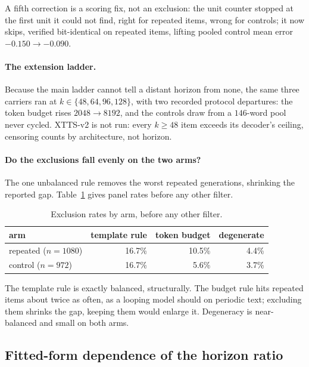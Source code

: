 A fifth correction is a scoring fix, not an exclusion: the unit counter stopped at the first unit
it could not find, right for repeated items, wrong for controls; it now skips, verified
bit-identical on repeated items, lifting pooled control mean error $-0.150\to-0.090$.

\paragraph{The extension ladder.} Because the main ladder cannot tell a distant horizon from
none, the same three carriers ran at $k\in\{48,64,96,128\}$, with two recorded protocol
departures: the token budget rises $2048\to8192$, and the controls draw from a $146$-word pool
never cycled. XTTS-v2 is not run: every $k\ge48$ item exceeds its decoder's ceiling, censoring
counts by architecture, not horizon.

\paragraph{Do the exclusions fall evenly on the two arms?} The one unbalanced rule removes the
worst repeated generations, shrinking the reported gap. Table~\ref{tab:exclarms} gives panel rates
before any other filter.

\begin{table}[tp]\centering
\caption{Exclusion rates by arm, before any other filter.}
\label{tab:exclarms}
\begin{tabular}{lrrr}
\toprule
arm & template rule & token budget & degenerate \\
\midrule
repeated ($n=1080$) & 16.7\% & 10.5\% & 4.4\% \\
control ($n=972$)   & 16.7\% & 5.6\%  & 3.7\% \\
\bottomrule
\end{tabular}
\end{table}

The template rule is exactly balanced, structurally. The budget rule hits repeated items about
twice as often, as a looping model should on periodic text; excluding them shrinks the gap,
keeping them would enlarge it. Degeneracy is near-balanced and small on both arms.

\subsection{Fitted-form dependence of the horizon ratio}
\label{sec:horizonform}

